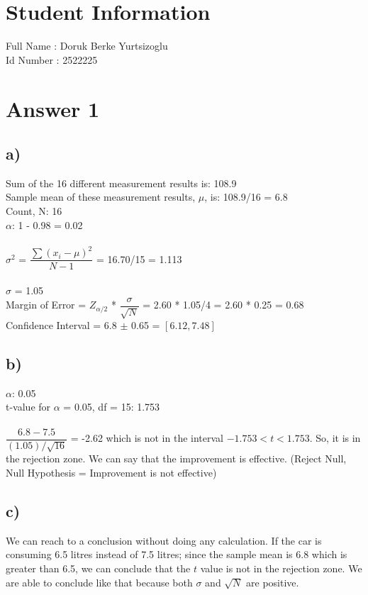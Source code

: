 \documentclass[12pt]{article}
\begin{document}
\section*{Student Information } 
Full Name : Doruk Berke Yurtsizoglu \\
Id Number :  2522225\\

\section*{Answer 1}

\subsection*{a)} 

Sum of the 16 different measurement results is: 108.9\\
Sample mean of these measurement results, $\mu$, is: 108.9/16 = 6.8\\
Count, N: 16\\
$\alpha$: 1 - 0.98 = 0.02\\
\\
$\sigma^2$ = $\dfrac{\sum (x_i - \mu)^2}{N-1}$ = 16.70/15 = 1.113\\
\\
$\sigma$ = 1.05\\
Margin of Error = $Z_{\alpha /2}$ * $\dfrac{\sigma}{\sqrt{N}}$ = 2.60 * 1.05/4 = 2.60 * 0.25 = 0.68\\
Confidence Interval = 6.8 $\pm$ 0.65 = $[6.12, 7.48]$\\


\subsection*{b)} 

$\alpha$: 0.05\\
t-value for $\alpha$ = 0.05, df = 15: 1.753\\
\\
$\dfrac{6.8 - 7.5}{(1.05)/\sqrt{16}}$ = -2.62 which is not in the interval $-1.753 < t < 1.753$. So, it is in the rejection zone. We can say that the improvement is effective. (Reject Null,  Null Hypothesis = Improvement is not effective)\\

\subsection*{c)} 
We can reach to a conclusion without doing any calculation. If the car is consuming 6.5 litres instead of 7.5 litres; since the sample mean is 6.8 which is greater than 6.5, we can conclude that the $t$ value is not in the rejection zone. We are able to conclude like that because both $\sigma$ and $\sqrt{N}$ are positive.
\end{document}
